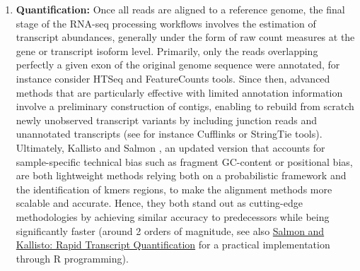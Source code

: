 \begin{enumerate}[label=(\roman*)]
    \item \textbf{Quantification:} Once all reads are aligned to a reference genome, the final stage of the RNA-seq processing workflows involves the estimation of transcript abundances, generally under the form of raw count measures at the gene or transcript isoform level. Primarily, only the reads overlapping perfectly a given exon of the original genome sequence were annotated, for instance consider HTSeq \autocite{anders_etal15} and FeatureCounts \autocite{liao_etal14} tools. Since then, advanced methods that are particularly effective with limited annotation information involve a preliminary construction of \glspl{contig}, enabling to rebuild from scratch newly unobserved transcript variants by including junction reads and unannotated transcripts (see for instance Cufflinks \autocite{trapnell_etal10} or StringTie \autocite{pertea_etal15} tools). Ultimately, Kallisto \autocite{bray_etal16} and Salmon \autocite{patro_etal17}, an updated version that accounts for sample-specific technical bias such as fragment GC-content or positional bias, are both lightweight methods relying both on a probabilistic framework and the identification of \glspl{kmer} regions, to make the alignment methods more scalable and accurate. Hence, they both stand out as cutting-edge methodologies by achieving similar accuracy to predecessors while being significantly faster (around 2 orders of magnitude, see also \href{https://gencore.bio.nyu.edu/salmon-kallisto-rapid-transcript-quantification-for-rna-seq-data}{Salmon and Kallisto: Rapid Transcript Quantification} for a practical implementation through R programming).
    
\end{enumerate}

